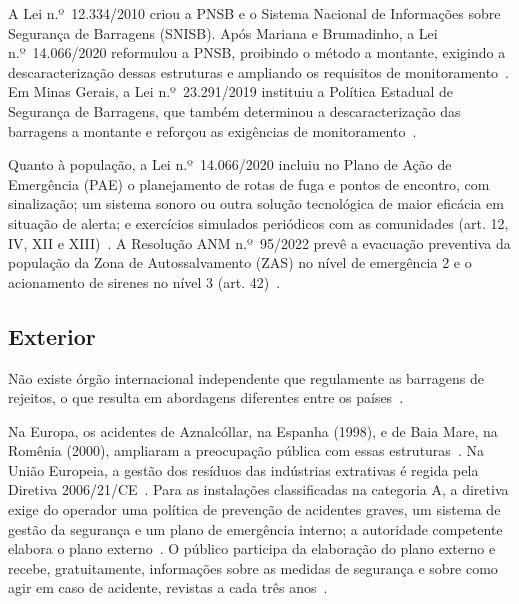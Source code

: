 A Lei n.º~12.334/2010 criou a PNSB e o Sistema Nacional de Informações
sobre Segurança de Barragens (SNISB). Após Mariana e Brumadinho, a Lei
n.º~14.066/2020 reformulou a PNSB, proibindo o método a montante, exigindo a descaracterização dessas estruturas e ampliando os requisitos de
monitoramento~\cite{brasil2010pnsb, brasil2020lei14066}.
Em Minas Gerais, a Lei n.º~23.291/2019 instituiu a Política Estadual de
Segurança de Barragens, que também determinou a descaracterização das
barragens a montante e reforçou as exigências de monitoramento~\cite{minasgerais2024historico}.

Quanto à população, a Lei n.º~14.066/2020 incluiu no Plano de Ação de
Emergência (PAE) o planejamento de rotas de fuga e pontos de encontro,
com sinalização; um sistema sonoro ou outra solução tecnológica de maior
eficácia em situação de alerta; e exercícios simulados periódicos com as
comunidades (art. 12, IV, XII e XIII)~\cite{brasil2010pnsb, brasil2020lei14066}.
A Resolução ANM n.º~95/2022 prevê a evacuação preventiva da população
da Zona de Autossalvamento (ZAS) no nível de emergência 2 e o
acionamento de sirenes no nível 3 (art. 42)~\cite{anm2022resolucao95}.

\subsection{Exterior}
\label{subsec:legislacao_exterior}

Não existe órgão internacional independente que regulamente as
barragens de rejeitos, o que resulta em abordagens diferentes entre os
países~\cite{londonmining2021explainer, earthworks2024safety}.

Na Europa, os acidentes de Aznalcóllar, na Espanha (1998), e de Baia
Mare, na Romênia (2000), ampliaram a preocupação pública com essas
estruturas~\cite[p.~846]{rico2008mine}. Na União Europeia, a gestão dos
resíduos das indústrias extrativas é regida pela Diretiva 2006/21/CE~\cite{ue2006diretiva}.
Para as instalações classificadas na categoria A, a diretiva exige do
operador uma política de prevenção de acidentes graves, um sistema de
gestão da segurança e um plano de emergência interno; a autoridade
competente elabora o plano externo~\cite[art.~6]{ue2006diretiva}.
O público participa da elaboração do plano externo e recebe,
gratuitamente, informações sobre as medidas de segurança e sobre como
agir em caso de acidente, revistas a cada três anos~\cite[art.~6]{ue2006diretiva}.

